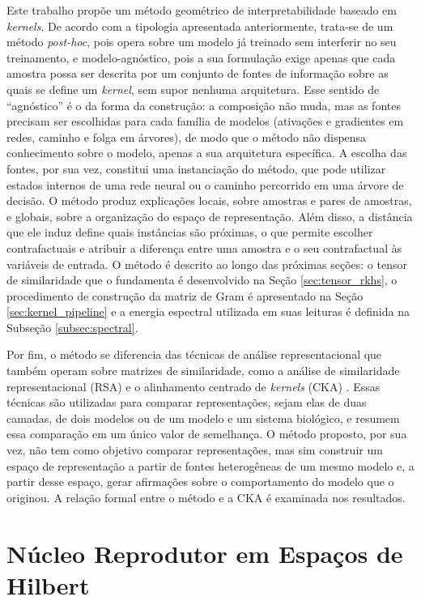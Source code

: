 Este trabalho propõe um método geométrico de interpretabilidade baseado em \textit{kernels}. De acordo com a tipologia apresentada anteriormente, trata-se de um método \textit{post-hoc}, pois opera sobre um modelo já treinado sem interferir no seu treinamento, e modelo-agnóstico, pois a sua formulação exige apenas que cada amostra possa ser descrita por um conjunto de fontes de informação sobre as quais se define um \textit{kernel}, sem supor nenhuma arquitetura. Esse sentido de ``agnóstico'' é o da forma da construção: a composição não muda, mas as fontes precisam ser escolhidas para cada família de modelos (ativações e gradientes em redes, caminho e folga em árvores), de modo que o método não dispensa conhecimento sobre o modelo, apenas a sua arquitetura específica. A escolha das fontes, por sua vez, constitui uma instanciação do método, que pode utilizar estados internos de uma rede neural ou o caminho percorrido em uma árvore de decisão. O método produz explicações locais, sobre amostras e pares de amostras, e globais, sobre a organização do espaço de representação. Além disso, a distância que ele induz define quais instâncias são próximas, o que permite escolher contrafactuais e atribuir a diferença entre uma amostra e o seu contrafactual às variáveis de entrada. O método é descrito ao longo das próximas seções: o tensor de similaridade que o fundamenta é desenvolvido na Seção \ref{sec:tensor_rkhs}, o procedimento de construção da matriz de Gram é apresentado na Seção \ref{sec:kernel_pipeline} e a energia espectral utilizada em suas leituras é definida na Subseção \ref{subsec:spectral}.

Por fim, o método se diferencia das técnicas de análise representacional que também operam sobre matrizes de similaridade, como a análise de similaridade representacional (RSA) \citep{Kriegeskorte2008} e o alinhamento centrado de \textit{kernels} (CKA) \citep{Kornblith2019}. Essas técnicas são utilizadas para comparar representações, sejam elas de duas camadas, de dois modelos ou de um modelo e um sistema biológico, e resumem essa comparação em um único valor de semelhança. O método proposto, por sua vez, não tem como objetivo comparar representações, mas sim construir um espaço de representação a partir de fontes heterogêneas de um mesmo modelo e, a partir desse espaço, gerar afirmações sobre o comportamento do modelo que o originou. A relação formal entre o método e a CKA é examinada nos resultados.

\section{Núcleo Reprodutor em Espaços de Hilbert}\label{sec:rkhs}

